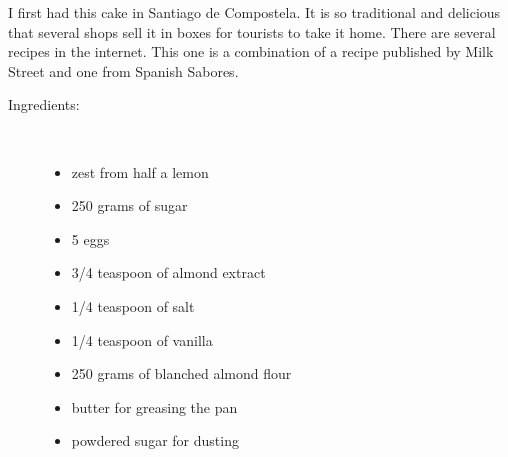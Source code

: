 \documentclass[11pt,letterpaper]{article}
\begin{document}


 
I first had this cake in Santiago de Compostela. It is so traditional and delicious that several shops sell it in boxes for tourists to take it home. There are several recipes in the internet. This one is a combination of a recipe published by Milk Street and one from Spanish Sabores.
\begin{description}

\item[Ingredients:]\ \\
	\begin{itemize}
	\item zest from half a lemon
	\item 250 grams of sugar
	\item 5 eggs
	\item 3/4 teaspoon of almond extract
	\item 1/4 teaspoon of salt 
	\item 1/4 teaspoon of vanilla
	\item 250 grams of blanched almond flour
	\item butter for greasing the pan
	\item powdered sugar for dusting
	\end{itemize}


\end{description}
\end{document}
